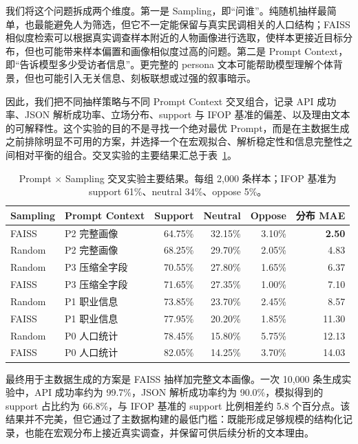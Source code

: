 \documentclass[11pt,a4paper]{ctexart}
\newcommand{\ifop}{IFOP}
\begin{document}
我们将这个问题拆成两个维度。第一是 Sampling，即“问谁”。纯随机抽样最简单，也最能避免人为筛选，但它不一定能保留与真实民调相关的人口结构；FAISS 相似度检索可以根据真实调查样本附近的人物画像进行选取，使样本更接近目标分布，但也可能带来样本偏置和画像相似度过高的问题。第二是 Prompt Context，即“告诉模型多少受访者信息”。更完整的 persona 文本可能帮助模型理解个体背景，但也可能引入无关信息、刻板联想或过强的叙事暗示。

因此，我们把不同抽样策略与不同 Prompt Context 交叉组合，记录 API 成功率、JSON 解析成功率、立场分布、support 与 \ifop{} 基准的偏差、以及理由文本的可解释性。这个实验的目的不是寻找一个绝对最优 Prompt，而是在主数据生成之前排除明显不可用的方案，并选择一个在宏观拟合、解析稳定性和信息完整性之间相对平衡的组合。交叉实验的主要结果汇总于表~\ref{tab:prompt_sampling}。

\begin{table}[H]
\centering
\caption{Prompt $\times$ Sampling 交叉实验主要结果。每组 2,000 条样本；IFOP 基准为 support 61\%、neutral 34\%、oppose 5\%。}
\label{tab:prompt_sampling}
\begin{tabular}{llrrrr}
\toprule
Sampling & Prompt Context & Support & Neutral & Oppose & 分布 MAE \\
\midrule
FAISS & P2 完整画像 & 64.75\% & 32.15\% & 3.10\% & \textbf{2.50} \\
Random & P2 完整画像 & 68.25\% & 29.70\% & 2.05\% & 4.83 \\
Random & P3 压缩全字段 & 70.55\% & 27.80\% & 1.65\% & 6.37 \\
FAISS & P3 压缩全字段 & 71.65\% & 27.35\% & 1.00\% & 7.10 \\
Random & P1 职业信息 & 73.85\% & 23.70\% & 2.45\% & 8.57 \\
FAISS & P1 职业信息 & 77.95\% & 20.20\% & 1.85\% & 11.30 \\
Random & P0 人口统计 & 78.45\% & 15.80\% & 5.75\% & 12.13 \\
FAISS & P0 人口统计 & 82.05\% & 14.25\% & 3.70\% & 14.03 \\
\bottomrule
\end{tabular}
\end{table}

最终用于主数据生成的方案是 FAISS 抽样加完整文本画像。一次 10,000 条生成实验中，API 成功率约为 99.7\%，JSON 解析成功率约为 90.0\%，模拟得到的 support 占比约为 66.8\%，与 \ifop{} 基准的 support 比例相差约 5.8 个百分点。该结果并不完美，但它通过了主数据构建的最低门槛：既能形成足够规模的结构化记录，也能在宏观分布上接近真实调查，并保留可供后续分析的文本理由。
\end{document}
